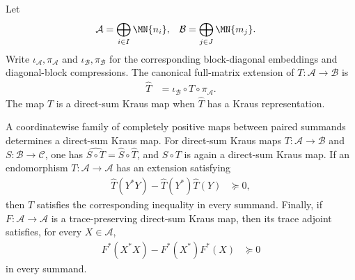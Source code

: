 \begin{definition}
    \label{def:kraus_map_between_direct_sums}
    \leanok
    Let
    \begin{align}
        \mathcal A
         & =\bigoplus_{i\in I}\MN{n_i},
         &
        \mathcal B
         & =\bigoplus_{j\in J}\MN{m_j}.
        \notag
    \end{align}
    Write $\iota_{\mathcal A},\pi_{\mathcal A}$ and $\iota_{\mathcal B},\pi_{\mathcal B}$ for the corresponding
    block-diagonal embeddings and diagonal-block compressions. The canonical full-matrix extension of $T:\mathcal A\to\mathcal B$ is
    \begin{align}
        \widehat T
         & =\iota_{\mathcal B}\circ T\circ\pi_{\mathcal A}.
        \label{eq:spectral_ds_kraus_extension}
    \end{align}
    The map $T$ is a direct-sum Kraus map when $\widehat T$ has a Kraus representation.
\end{definition}

\begin{lemma}
    \label{lem:direct_sum_kraus_composition_schwarz}
    \leanok
    A coordinatewise family of completely positive maps between paired
    summands determines a direct-sum Kraus map. For direct-sum Kraus maps
    $T:\mathcal A\to\mathcal B$ and $S:\mathcal B\to\mathcal C$, one has
    $\widehat{S\circ T}=\widehat S\circ\widehat T$, and $S\circ T$ is again a direct-sum Kraus map. If an endomorphism
    $T:\mathcal A\to\mathcal A$ has an extension satisfying
    \begin{align}
        \widehat T(Y^*Y)-\widehat T(Y^*)\widehat T(Y)
         & \succeq0,
        \label{eq:spectral_ds_extension_schwarz}
    \end{align}
    then $T$ satisfies the corresponding inequality in every summand. Finally, if $F:\mathcal A\to\mathcal A$ is a trace-preserving direct-sum
    Kraus map, then its trace adjoint satisfies, for every $X\in\mathcal A$,
    \begin{align}
        F^*(X^*X)-F^*(X^*)F^*(X)
         & \succeq0
        \label{eq:spectral_ds_adjoint_schwarz}
    \end{align}
    in every summand.
\end{lemma}

